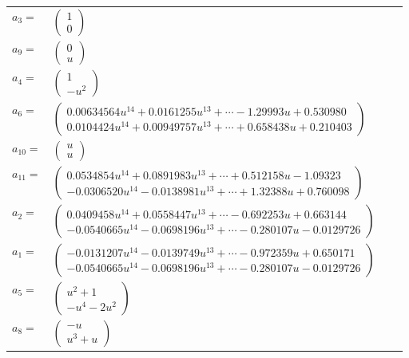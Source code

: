 \documentclass[1p]{elsarticle_modified}
\theoremstyle{definition}
\begin{document}
\begin{tabular}{m{7pt} m{180pt} m{7pt} m{180pt} }
\flushright $a_{3}=$&$\begin{pmatrix}1\\0\end{pmatrix}$ \\
\flushright $a_{9}=$&$\begin{pmatrix}0\\u\end{pmatrix}$ \\
\flushright $a_{4}=$&$\begin{pmatrix}1\\- u^2\end{pmatrix}$ \\
\flushright $a_{6}=$&$\begin{pmatrix}0.00634564 u^{14}+0.0161255 u^{13}+\cdots-1.29993 u+0.530980\\0.0104424 u^{14}+0.00949757 u^{13}+\cdots+0.658438 u+0.210403\end{pmatrix}$ \\
\flushright $a_{10}=$&$\begin{pmatrix}u\\u\end{pmatrix}$ \\
\flushright $a_{11}=$&$\begin{pmatrix}0.0534854 u^{14}+0.0891983 u^{13}+\cdots+0.512158 u-1.09323\\-0.0306520 u^{14}-0.0138981 u^{13}+\cdots+1.32388 u+0.760098\end{pmatrix}$ \\
\flushright $a_{2}=$&$\begin{pmatrix}0.0409458 u^{14}+0.0558447 u^{13}+\cdots-0.692253 u+0.663144\\-0.0540665 u^{14}-0.0698196 u^{13}+\cdots-0.280107 u-0.0129726\end{pmatrix}$ \\
\flushright $a_{1}=$&$\begin{pmatrix}-0.0131207 u^{14}-0.0139749 u^{13}+\cdots-0.972359 u+0.650171\\-0.0540665 u^{14}-0.0698196 u^{13}+\cdots-0.280107 u-0.0129726\end{pmatrix}$ \\
\flushright $a_{5}=$&$\begin{pmatrix}u^2+1\\- u^4-2 u^2\end{pmatrix}$ \\
\flushright $a_{8}=$&$\begin{pmatrix}- u\\u^3+u\end{pmatrix}$ \\

\end{tabular}
\end{document}
